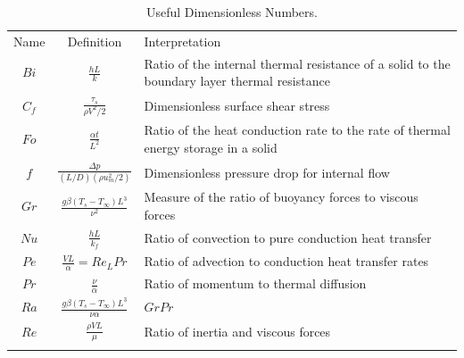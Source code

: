 \documentclass[paper=letter, fontsize=11pt]{scrartcl}
\numberwithin{equation}{section}        %
\numberwithin{figure}{section}          %
\numberwithin{table}{section}               %
\begin{document}
\begin{table}[!ht]
\caption{Useful Dimensionless Numbers.}
\centering
  \begin{tabular}{ c c m{8cm}}
    \noalign{\smallskip}
    Name & Definition & Interpretation \\
    \noalign{\smallskip}\hline\noalign{\smallskip}
    $Bi$  & $\frac{hL}{k}$ & Ratio of the internal thermal resistance of a solid to the boundary layer thermal resistance \\
    $C_f$ & $\frac{\tau_s}{\rho V^2/2}$ & Dimensionless surface shear stress \\
    $Fo$  & $\frac{\alpha t}{L^2}$ & Ratio of the heat conduction rate to the rate of thermal energy storage in a solid \\
    $f$   & $\frac{\Delta p}{(L/D)(\rho u_m^2/2)}$ & Dimensionless pressure drop for internal flow \\
    $Gr$  & $\frac{g\beta(T_s-T_\infty)L^3}{\nu^2}$ & Measure of the ratio of buoyancy forces to viscous forces \\
    $Nu$  & $\frac{hL}{k_f}$ & Ratio of convection to pure conduction heat transfer \\
    $Pe$  & $\frac{VL}{\alpha}=Re_LPr$ & Ratio of advection to conduction heat transfer rates \\
    $Pr$  & $\frac{\nu}{\alpha}$ & Ratio of momentum to thermal diffusion \\
    $Ra$  & $\frac{g\beta(T_s-T_\infty)L^3}{\nu\alpha}$ & $GrPr$ \\
    $Re$  & $\frac{\rho V L}{\mu}$ & Ratio of inertia and viscous forces \\
    \noalign{\smallskip}\hline
  \end{tabular}
\end{table}

\end{document}

